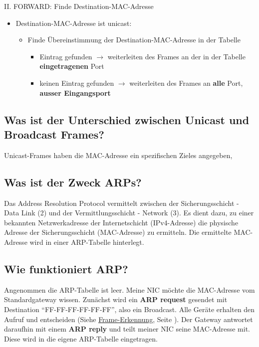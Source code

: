 II. FORWARD: Finde Destination-MAC-Adresse
\begin{itemize}
    \item Destination-MAC-Adresse ist unicast:
    \begin{itemize}
        \item Finde Übereinstimmung der Destination-MAC-Adresse in der Tabelle
        \begin{itemize}
            \item Eintrag gefunden $\rightarrow$ weiterleiten des Frames an der in der Tabelle \textbf{eingetragenen} Port
            \item keinen Eintrag gefunden $\rightarrow$ weiterleiten des Frames an \textbf{alle} Port, \textbf{ausser Eingangsport}
        \end{itemize}
    \end{itemize}
\end{itemize}

\subsection*{Was ist der Unterschied zwischen \flqq Unicast\frqq{} und \flqq Broadcast\frqq{} Frames?}
Unicast-Frames haben die MAC-Adresse ein spezifischen Zieles angegeben,

\subsection*{Was ist der Zweck ARPs?}
Das Address Resolution Protocol vermittelt zwischen der Sicherungsschicht - Data Link (2) und der Vermittlungsschicht - Network (3). Es dient dazu, zu einer bekannten Netzwerkadresse der Internetschicht (IPv4-Adresse) die physische Adresse der Sicherungsschicht (MAC-Adresse) zu ermitteln. Die ermittelte MAC-Adresse wird in einer ARP-Tabelle hinterlegt.

\subsection*{Wie funktioniert ARP?}
Angenommen die ARP-Tabelle ist leer. Meine NIC möchte die MAC-Adresse vom Standardgateway wissen. Zunächst wird ein \textbf{ARP request} gesendet mit Destination "`FF-FF-FF-FF-FF-FF"', also ein Broadcast. Alle Geräte erhalten den Aufruf und entscheiden (Siehe \underline{\hyperref[sub:Frameerkennung]{Frame-Erkennung}}, Seite \pageref{sub:Frameerkennung}). Der Gateway antwortet daraufhin mit einem \textbf{ARP reply} und teilt meiner NIC seine MAC-Adresse mit. Diese wird in die eigene ARP-Tabelle eingetragen.